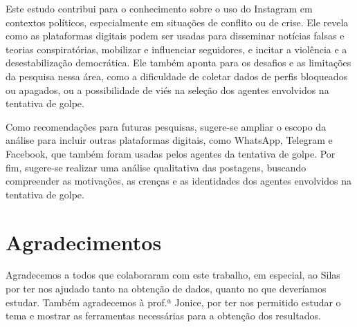 \documentclass[manuscript,screen,review]{acmart}
\begin{document}
Este estudo contribui para o conhecimento sobre o uso do Instagram em contextos políticos, especialmente em situações de conflito ou de crise. Ele revela como as plataformas digitais podem ser usadas para disseminar notícias falsas e teorias conspiratórias, mobilizar e influenciar seguidores, e incitar a violência e a desestabilização democrática. Ele também aponta para os desafios e as limitações da pesquisa nessa área, como a dificuldade de coletar dados de perfis bloqueados ou apagados, ou a possibilidade de viés na seleção dos agentes envolvidos na tentativa de golpe.

Como recomendações para futuras pesquisas, sugere-se ampliar o escopo da análise para incluir outras plataformas digitais, como WhatsApp, Telegram e Facebook, que também foram usadas pelos agentes da tentativa de golpe. Por fim, sugere-se realizar uma análise qualitativa das postagens, buscando compreender as motivações, as crenças e as identidades dos agentes envolvidos na tentativa de golpe.

\section{Agradecimentos}

Agradecemos a todos que colaboraram com este trabalho, em especial, ao Silas por ter nos ajudado tanto na obtenção de dados, quanto no que deveríamos estudar. Também agradecemos à prof.ª Jonice, por ter nos permitido estudar o tema e mostrar as ferramentas necessárias para a obtenção dos resultados.



\end{document}
